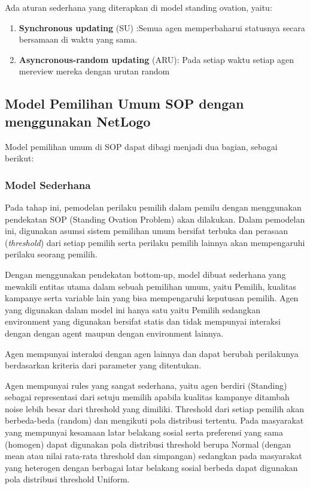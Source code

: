 Ada aturan sederhana yang diterapkan di model standing ovation, yaitu:
\begin{enumerate}
	\item \textbf{Synchronous updating} (SU) :Semua agen memperbaharui statusnya secara bersamaan di waktu yang sama.

	\item \textbf{Asyncronous-random updating} (ARU): Pada setiap waktu setiap agen mereview mereka dengan urutan random
\end{enumerate}

\subsection{Model Pemilihan Umum SOP dengan menggunakan NetLogo}\label{sec:sbab_c}

Model pemilihan umum di SOP dapat dibagi menjadi dua bagian, sebagai berikut:

\subsubsection{Model Sederhana}

Pada tahap ini, pemodelan perilaku pemilih dalam pemilu dengan menggunakan pendekatan SOP (Standing Ovation Problem) akan dilakukan. Dalam pemodelan ini, digunakan asumsi sistem pemilihan umum bersifat terbuka dan perasaan (\textit{threshold}) dari setiap pemilih serta perilaku pemilih lainnya akan mempengaruhi perilaku seorang pemilih.

Dengan menggunakan pendekatan bottom-up, model dibuat sederhana yang mewakili entitas utama dalam sebuah pemilihan umum, yaitu Pemilih, kualitas kampanye serta variable lain yang bisa mempengaruhi keputusan pemilih. Agen yang digunakan dalam model ini hanya satu yaitu Pemilih sedangkan environment yang digunakan bersifat statis dan tidak mempunyai interaksi dengan dengan agent maupun dengan environment lainnya.

Agen mempunyai interaksi dengan agen lainnya dan dapat berubah perilakunya berdasarkan kriteria dari parameter yang ditentukan.

Agen mempunyai rules yang sangat sederhana, yaitu agen berdiri (Standing) sebagai representasi dari setuju memilih apabila kualitas kampanye ditambah noise lebih besar dari threshold yang dimiliki. Threshold dari setiap pemilih akan berbeda-beda (random) dan mengikuti pola distribusi tertentu. Pada masyarakat yang mempunyai kesamaan latar belakang sosial serta preferensi yang sama (homogen) dapat digunakan pola distribusi threshold berupa Normal (dengan mean atau nilai rata-rata threshold dan simpangan) sedangkan pada masyarakat yang heterogen dengan berbagai latar belakang sosial berbeda dapat digunakan pola distribusi threshold Uniform.

